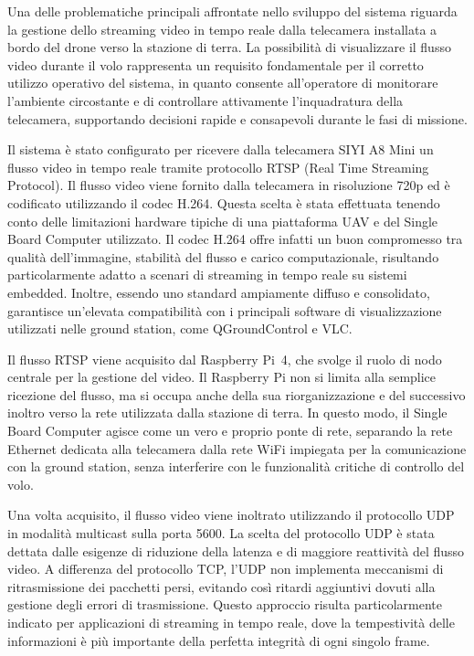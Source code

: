 Una delle problematiche principali affrontate nello sviluppo del sistema riguarda la gestione dello streaming video in tempo reale dalla telecamera installata a bordo del drone verso la stazione di terra.
La possibilità di visualizzare il flusso video durante il volo rappresenta un requisito fondamentale per il corretto utilizzo operativo del sistema, in quanto consente all’operatore di monitorare l’ambiente circostante e di controllare attivamente l’inquadratura della telecamera, supportando decisioni rapide e consapevoli durante le fasi di missione.

Il sistema è stato configurato per ricevere dalla telecamera SIYI A8 Mini un flusso video in tempo reale tramite protocollo RTSP (Real Time Streaming Protocol).\cite{rtsp}
Il flusso video viene fornito dalla telecamera in risoluzione 720p ed è codificato utilizzando il codec H.264.
Questa scelta è stata effettuata tenendo conto delle limitazioni hardware tipiche di una piattaforma UAV e del Single Board Computer utilizzato.
Il codec H.264 offre infatti un buon compromesso tra qualità dell’immagine, stabilità del flusso e carico computazionale, risultando particolarmente adatto a scenari di streaming in tempo reale su sistemi embedded.
Inoltre, essendo uno standard ampiamente diffuso e consolidato, garantisce un’elevata compatibilità con i principali software di visualizzazione utilizzati nelle ground station, come QGroundControl e VLC.

Il flusso RTSP viene acquisito dal Raspberry Pi~4, che svolge il ruolo di nodo centrale per la gestione del video.
Il Raspberry Pi non si limita alla semplice ricezione del flusso, ma si occupa anche della sua riorganizzazione e del successivo inoltro verso la rete utilizzata dalla stazione di terra.
In questo modo, il Single Board Computer agisce come un vero e proprio ponte di rete, separando la rete Ethernet dedicata alla telecamera dalla rete WiFi impiegata per la comunicazione con la ground station, senza interferire con le funzionalità critiche di controllo del volo.

Una volta acquisito, il flusso video viene inoltrato utilizzando il protocollo UDP in modalità multicast sulla porta 5600.
La scelta del protocollo UDP è stata dettata dalle esigenze di riduzione della latenza e di maggiore reattività del flusso video.
A differenza del protocollo TCP, l’UDP non implementa meccanismi di ritrasmissione dei pacchetti persi, evitando così ritardi aggiuntivi dovuti alla gestione degli errori di trasmissione.
Questo approccio risulta particolarmente indicato per applicazioni di streaming in tempo reale, dove la tempestività delle informazioni è più importante della perfetta integrità di ogni singolo frame.

